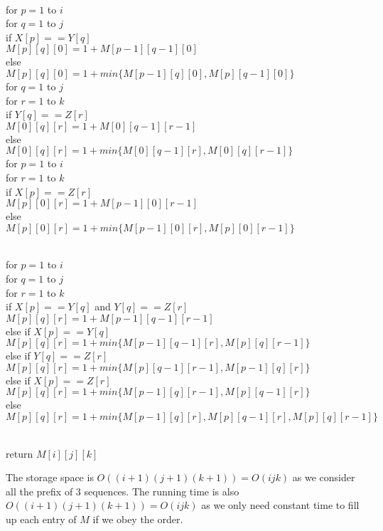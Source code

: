 \documentclass[11pt]{article}
\begin{document}
\begin{solution}
\begin{algo}
\\		for $p = 1$ to $i$\+
\\			for $q = 1$ to $j$\+
\\				if $X[p] == Y[q]$\+
\\					$M[p][q][0] = 1 + M[p-1][q-1][0]$\-
\\				else\+
\\					$M[p][q][0] = 1 + min\{M[p-1][q][0], M[p][q-1][0] \}$\- \- \-
\\		for $q = 1$ to $j$\+
\\			for $r = 1$ to $k$\+
\\				if $Y[q] == Z[r]$\+
\\					$M[0][q][r] = 1 + M[0][q-1][r-1]$\-
\\				else\+
\\					$M[0][q][r] = 1 + min\{M[0][q-1][r], M[0][q][r-1] \}$\- \- \-
\\		for $p = 1$ to $i$\+
\\			for $r = 1$ to $k$\+
\\				if $X[p] == Z[r]$\+
\\					$M[p][0][r] = 1 + M[p-1][0][r-1]$\-
\\				else\+
\\					$M[p][0][r] = 1 + min\{M[p-1][0][r], M[p][0][r-1] \}$\- \- \-

\\		for $p = 1$ to $i$\+
\\			for $q = 1$ to $j$\+
\\				for $r = 1$ to $k$\+
\\					if $X[p] == Y[q]$ and $Y[q] == Z[r]$\+
\\						$M[p][q][r] = 1 + M[p-1][q-1][r-1]$\-
\\					else if $X[p] == Y[q]$\+
\\						$M[p][q][r] = 1 + min\{M[p-1][q-1][r], M[p][q][r-1] \}$\-
\\					else if $Y[q] == Z[r]$\+
\\						$M[p][q][r] = 1 + min\{M[p][q-1][r-1], M[p-1][q][r] \}$\-
\\					else if $X[p] == Z[r]$\+
\\						$M[p][q][r] = 1 + min\{M[p-1][q][r-1], M[p][q-1][r] \}$\-
\\					else\+
\\						$M[p][q][r] = 1 + min\{M[p-1][q][r], M[p][q-1][r], M[p][q][r-1] \}$\- \- \- \-

\\		return $M[i][j][k]$
\\[0.5ex]
\end{algo}
	
	The storage space is $O((i+1)(j+1)(k+1)) = O(ijk)$ as we consider all the prefix of $3$ sequences. The running time is also $O((i+1)(j+1)(k+1)) = O(ijk)$ as we only need constant time to fill up each entry of $M$ if we obey the order. 
\end{solution}
\clearpage
\end{document}
